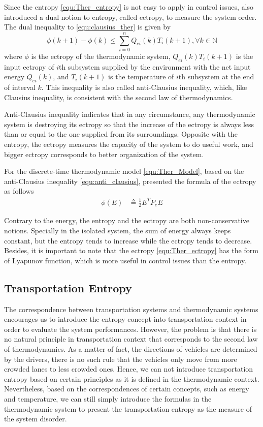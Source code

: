 \documentclass[trsc,nonblindrev]{informs3} %
\renewcommand{\vec}[1]{#1}
\newcommand{\mat}[1]{#1}
\begin{document}
Since the entropy \eqref{equ:Ther_entropy} is not easy
to apply in control issues, \citet{haddad_thermodynamic_2005} also
introduced a dual notion to entropy, called ectropy, to measure the
system order. The dual inequality to \eqref{equ:clausius_ther} is
given by
\begin{equation}\label{equ:anti_clausius}
\phi(k+1)-\phi(k)\le \sum_{i=0}^n Q_{ei}(k)T_i(k+1),
\forall k\in\mathbb{N}
\end{equation}
where $\phi$ is the ectropy of the thermodynamic system,
$Q_{ei}(k)T_i(k+1)$ is the input ectropy of $i$th subsystem supplied
by the environment with the net input energy $Q_{ei}(k)$, and
$T_i(k+1)$ is the temperature of $i$th subsystem at the end of
interval $k$. This inequality is also called anti-Clausius
inequality, which, like Clausius inequality, is consistent with the
second law of thermodynamics.

Anti-Clausius inequality indicates that in any circumstance, any
thermodynamic system is destroying its ectropy so that the increase
of the ectropy is always less than or equal to the one supplied from
its surroundings. Opposite with the entropy, the ectropy measures the
capacity of the system to do useful work, and bigger ectropy
corresponds to better organization of the system.

For the discrete-time thermodynamic model \eqref{equ:Ther_Model},
based on the anti-Clausius inequality \eqref{equ:anti_clausius},
\citet{haddad_thermodynamic_2005} presented the formula of the
ectropy as follows
\begin{align}
\phi(\vec{E})&\triangleq\frac{1}{2}\vec{E}^T \mat{P}_e \vec{E}
\label{equ:Ther_ectropy}
\end{align}

Contrary to the energy, the entropy and the ectropy are both
non-conservative notions. Specially in the isolated system, the sum
of energy always keeps constant, but the entropy tends to increase
while the ectropy tends to decrease. Besides, it is important to note
that the ectropy \eqref{equ:Ther_ectropy} has the form of Lyapunov
function, which is more useful in control issues than the entropy.

\subsection{Transportation Entropy}
The correspondence between transportation systems and thermodynamic
systems encourages us to introduce the entropy concept into
transportation context in order to evaluate the system performances.
However, the problem is that there is no natural principle in
transportation context that corresponds to the second law of
thermodynamics. As a matter of fact, the directions of vehicles are
determined by the drivers, there is no such rule that the vehicles
only move from more crowded lanes to less crowded ones. Hence, we can
not introduce transportation entropy based on certain principles as
it is defined in the thermodynamic context. Nevertheless, based on
the correspondences of certain concepts, such as energy and
temperature, we can still simply introduce the formulas in the
thermodynamic system to present the transportation entropy as the
measure of the system disorder.
\end{document}

